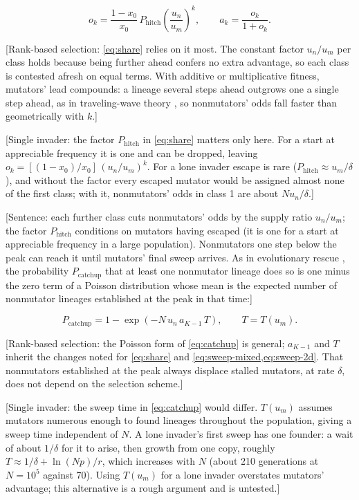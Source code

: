 \begin{equation}
  o_k = \frac{1 - x_0}{x_0}\, P_\mathrm{hitch} \left(\frac{u_n}{u_m}\right)^{k},
  \qquad a_k = \frac{o_k}{1 + o_k}. \label{eq:share}
\end{equation}

[Rank-based selection: \cref{eq:share} relies on it most. The constant factor $u_n / u_m$ per class holds because being further ahead confers no extra advantage, so each class is contested afresh on equal terms.
With additive or multiplicative fitness, mutators' lead compounds: a lineage several steps ahead outgrows one a single step ahead, as in traveling-wave theory \citep{desai2007beneficial}, so nonmutators' odds fall faster than geometrically with $k$.]

[Single invader: the factor $P_\mathrm{hitch}$ in \cref{eq:share} matters only here. For a start at appreciable frequency it is one and can be dropped, leaving $o_k = [(1 - x_0)/x_0]\,(u_n/u_m)^k$. For a lone invader escape is rare ($P_\mathrm{hitch} \approx u_m / \delta$), and without the factor every escaped mutator would be assigned almost none of the first class; with it, nonmutators' odds in class 1 are about $N u_n / \delta$.]

[Sentence: each further class cuts nonmutators' odds by the supply ratio $u_n / u_m$; the factor $P_\mathrm{hitch}$ conditions on mutators having escaped (it is one for a start at appreciable frequency in a large population).
Nonmutators one step below the peak can reach it until mutators' final sweep arrives.
As in evolutionary rescue \citep{orr2008population}, the probability $P_\mathrm{catchup}$ that at least one nonmutator lineage does so is one minus the zero term of a Poisson distribution whose mean is the expected number of nonmutator lineages established at the peak in that time:]

\begin{equation}
  P_\mathrm{catchup} = 1 - \exp\!\left(-N\, u_n\, a_{K-1}\, T\right),
  \qquad
  T = T(u_m). \label{eq:catchup}
\end{equation}

[Rank-based selection: the Poisson form of \cref{eq:catchup} is general; $a_{K-1}$ and $T$ inherit the changes noted for \cref{eq:share} and \cref{eq:sweep-mixed,eq:sweep-2d}.
That nonmutators established at the peak always displace stalled mutators, at rate $\delta$, does not depend on the selection scheme.]

[Single invader: the sweep time in \cref{eq:catchup} would differ. $T(u_m)$ assumes mutators numerous enough to found lineages throughout the population, giving a sweep time independent of $N$. A lone invader's first sweep has one founder: a wait of about $1/\delta$ for it to arise, then growth from one copy, roughly $T \approx 1/\delta + \ln(N p)/r$, which increases with $N$ (about 210 generations at $N = 10^5$ against 70). Using $T(u_m)$ for a lone invader overstates mutators' advantage; this alternative is a rough argument and is untested.]

